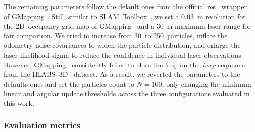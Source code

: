 The remaining parameters follow the default ones from the official
\gls{ros}~\cite{ros} wrapper of GMapping~\cite{grisetti:tro:2007}.
Still, similar to SLAM~Toolbox~\cite{macenski-jambrecic:joss:2021},
we set a \SI{0.03}{\metre} resolution for the 2D~occupancy grid map of
GMapping~\cite{grisetti:tro:2007} and a \SI{30}{\metre} maximum laser range
for fair comparison. We tried to increase from 30~to 250~particles,
inflate the odometry-noise covariances to widen the particle distribution, and
enlarge the laser-likelihood sigma to reduce the confidence in
individual laser observations. However, GMapping~\cite{grisetti:tro:2007}
consistently failed to close the loop on the \emph{Loop} sequence from the
IILABS~3D~\cite{ribeiro:access:2025} dataset.
As a result, we reverted the parameters to the defaults ones and set
the particles count to $N = 100$, only changing the minimum linear and angular
update thresholds across the three configurations evaluated in this work.

\subsubsection{Evaluation metrics}
\label{sec:slam:results:iilabs3d:metrics}

